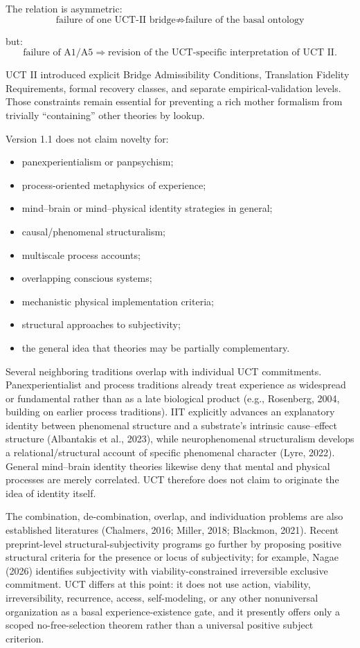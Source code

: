 \documentclass[
  11pt,
  a4paper,
]{article}
\providecommand{\tightlist}{%
  \setlength{\itemsep}{0pt}\setlength{\parskip}{0pt}}
\begin{document}
The relation is asymmetric:
\nopagebreak[4]
\[
\boxed{
\text{failure of one UCT-II bridge}
\not\Rightarrow
\text{failure of the basal ontology}
}
\]

but:
\nopagebreak[4]
\[
\boxed{
\text{failure of A1/A5}
\Rightarrow
\text{revision of the UCT-specific interpretation of UCT II}.
}
\]

UCT II introduced explicit Bridge Admissibility Conditions, Translation
Fidelity Requirements, formal recovery classes, and separate
empirical-validation levels. Those constraints remain essential for
preventing a rich mother formalism from trivially ``containing'' other
theories by lookup.

Version 1.1 does not claim novelty for:

\begin{itemize}
\tightlist
\item
  panexperientialism or panpsychism;
\item
  process-oriented metaphysics of experience;
\item
  mind--brain or mind--physical identity strategies in general;
\item
  causal/phenomenal structuralism;
\item
  multiscale process accounts;
\item
  overlapping conscious systems;
\item
  mechanistic physical implementation criteria;
\item
  structural approaches to subjectivity;
\item
  the general idea that theories may be partially complementary.
\end{itemize}

Several neighboring traditions overlap with individual UCT commitments.
Panexperientialist and process traditions already treat experience as
widespread or fundamental rather than as a late biological product
(e.g., Rosenberg, 2004, building on earlier process traditions). IIT
explicitly advances an explanatory identity between phenomenal structure
and a substrate's intrinsic cause--effect structure (Albantakis et al.,
2023), while neurophenomenal structuralism develops a
relational/structural account of specific phenomenal character (Lyre,
2022). General mind--brain identity theories likewise deny that mental
and physical processes are merely correlated. UCT therefore does not
claim to originate the idea of identity itself.

The combination, de-combination, overlap, and individuation problems are
also established literatures (Chalmers, 2016; Miller, 2018; Blackmon,
2021). Recent preprint-level structural-subjectivity programs go further
by proposing positive structural criteria for the presence or locus of
subjectivity; for example, Nagae (2026) identifies subjectivity with
viability-constrained irreversible exclusive commitment. UCT differs at
this point: it does not use action, viability, irreversibility,
recurrence, access, self-modeling, or any other nonuniversal
organization as a basal experience-existence gate, and it presently
offers only a scoped no-free-selection theorem rather than a universal
positive subject criterion.
\end{document}
